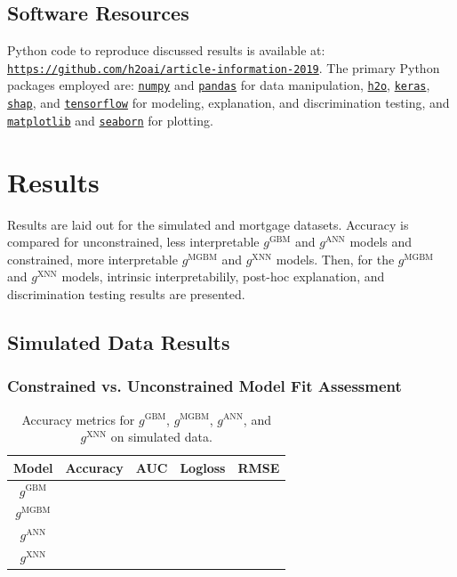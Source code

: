 \documentclass[information,article,submit,moreauthors,pdftex]{definitions/mdpi}
\begin{document}
\subsection{Software Resources}\label{ssec:soft}

Python code to reproduce discussed results is available at: \texttt{\url{https://github.com/h2oai/article-information-2019}}. The primary Python packages employed are: \href{https://numpy.org/}{\texttt{numpy}} and \href{https://pandas.pydata.org/}{\texttt{pandas}} for data manipulation, \href{https://github.com/h2oai/h2o-3}{\texttt{h2o}}, \href{https://keras.io/}{\texttt{keras}}, \href{https://github.com/slundberg/shap}{\texttt{shap}}, and \href{https://www.tensorflow.org/}{\texttt{tensorflow}} for modeling, explanation, and discrimination testing, and \href{https://matplotlib.org/}{\texttt{matplotlib}} and \href{https://seaborn.pydata.org/}{\texttt{seaborn}} for plotting. 

\section{Results}\label{sec:res}

Results are laid out for the simulated and mortgage datasets. Accuracy is compared for unconstrained, less interpretable $g^{\text{GBM}}$ and $g^{\text{ANN}}$ models and constrained, more interpretable $g^{\text{MGBM}}$ and $g^{\text{XNN}}$ models. Then, for the  $g^{\text{MGBM}}$ and $g^{\text{XNN}}$ models, intrinsic interpretabilily, post-hoc explanation, and discrimination testing results are presented.

\subsection{Simulated Data Results}

\subsubsection{Constrained vs. Unconstrained Model Fit Assessment}

\begin{table}[H]
\label{tab:sim_acc}
\caption{Accuracy metrics for $g^\text{GBM}$, $g^\text{MGBM}$, $g^\text{ANN}$, and $g^\text{XNN}$ on simulated data.}
\centering
\begin{tabular}{ccccc}
\toprule
\textbf{Model}		& \textbf{Accuracy}	& \textbf{AUC}	 & \textbf{Logloss}	& \textbf{RMSE}\\
\midrule
$g^\text{GBM}$		& 				& 			& 				& \\
$g^\text{MGBM}$	& 				& 			& 				& \\
$g^\text{ANN}$		& 				& 			& 				& \\
$g^\text{XNN}$		& 				& 			& 				& \\
\bottomrule
\end{tabular}
\end{table}
\end{document}
